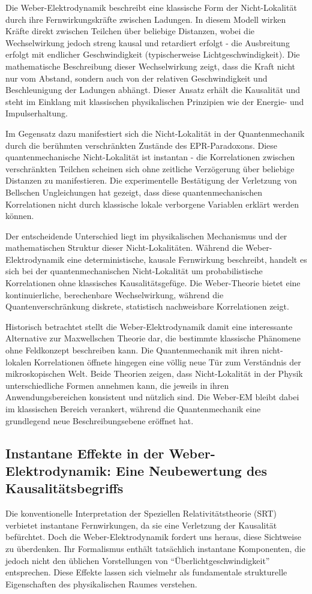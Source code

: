 Die Weber-Elektrodynamik beschreibt eine klassische Form der Nicht-Lokalität durch ihre Fernwirkungskräfte zwischen Ladungen. In diesem Modell wirken Kräfte direkt zwischen Teilchen über
beliebige Distanzen, wobei die Wechselwirkung jedoch streng kausal und retardiert erfolgt - die Ausbreitung erfolgt mit endlicher Geschwindigkeit (typischerweise Lichtgeschwindigkeit).
Die mathematische Beschreibung dieser Wechselwirkung zeigt, dass die Kraft nicht nur vom Abstand, sondern auch von der relativen Geschwindigkeit und Beschleunigung der Ladungen abhängt.
Dieser Ansatz erhält die Kausalität und steht im Einklang mit klassischen physikalischen Prinzipien wie der Energie- und Impulserhaltung.

Im Gegensatz dazu manifestiert sich die Nicht-Lokalität in der Quantenmechanik durch die berühmten verschränkten Zustände des EPR-Paradoxons. Diese quantenmechanische Nicht-Lokalität ist
instantan - die Korrelationen zwischen verschränkten Teilchen scheinen sich ohne zeitliche Verzögerung über beliebige Distanzen zu manifestieren. Die experimentelle Bestätigung der Verletzung
von Bellschen Ungleichungen hat gezeigt, dass diese quantenmechanischen Korrelationen nicht durch klassische lokale verborgene Variablen erklärt werden können.

Der entscheidende Unterschied liegt im physikalischen Mechanismus und der mathematischen Struktur dieser Nicht-Lokalitäten. Während die Weber-Elektrodynamik eine deterministische, kausale
Fernwirkung beschreibt, handelt es sich bei der quantenmechanischen Nicht-Lokalität um probabilistische Korrelationen ohne klassisches Kausalitätsgefüge. Die Weber-Theorie bietet eine
kontinuierliche, berechenbare Wechselwirkung, während die Quantenverschränkung diskrete, statistisch nachweisbare Korrelationen zeigt.

Historisch betrachtet stellt die Weber-Elektrodynamik damit eine interessante Alternative zur Maxwellschen Theorie dar, die bestimmte klassische Phänomene ohne Feldkonzept beschreiben kann.
Die Quantenmechanik mit ihren nicht-lokalen Korrelationen öffnete hingegen eine völlig neue Tür zum Verständnis der mikroskopischen Welt. Beide Theorien zeigen, dass Nicht-Lokalität in der
Physik unterschiedliche Formen annehmen kann, die jeweils in ihren Anwendungsbereichen konsistent und nützlich sind. Die Weber-EM bleibt dabei im klassischen Bereich verankert, während die
Quantenmechanik eine grundlegend neue Beschreibungsebene eröffnet hat.

\subsection{Instantane Effekte in der Weber-Elektrodynamik: Eine Neubewertung des Kausalitätsbegriffs}
Die konventionelle Interpretation der Speziellen Relativitätstheorie (SRT) verbietet instantane Fernwirkungen, da sie eine Verletzung der Kausalität befürchtet. Doch die Weber-Elektrodynamik
fordert uns heraus, diese Sichtweise zu überdenken. Ihr Formalismus enthält tatsächlich instantane Komponenten, die jedoch nicht den üblichen Vorstellungen von \enquote{Überlichtgeschwindigkeit}
entsprechen. Diese Effekte lassen sich vielmehr als fundamentale strukturelle Eigenschaften des physikalischen Raumes verstehen.

